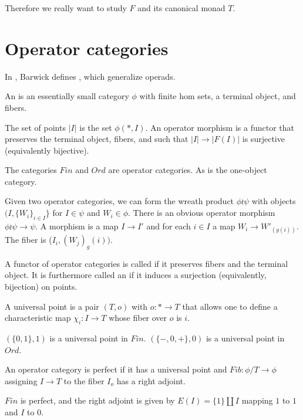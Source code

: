 Therefore we really want to study $F$ and its canonical monad $T.$

\section{Operator categories}
In \cite{Barwick18}, Barwick defines , which generalize operads. 

\begin{definition}
    An  is an essentially small category $\phi$ with finite hom sets, a terminal object, and fibers.
\end{definition}

The set of points $|I|$ is the set $\phi(*,I)$. An operator morphism is a functor that preserves the terminal object, fibers, and such that $|I|\rightarrow |F(I)|$ is surjective (equivalently bijective).

\begin{example}
    The categories $Fin$ and $Ord$ are operator categories. As is the one-object category.
\end{example}

Given two operator categories, we can form the wreath product $\phi\wr \psi$ with objects $(I,\{W_i\}_{i\in I}\}$ for $I\in \psi$ and $W_i\in \phi$. There is an obvious operator morphism $\phi\wr\psi\rightarrow \psi$. A morphism is a map $I\rightarrow I'$ and for each $i\in I$ a map $W_i\rightarrow W'_(g(i))$. The fiber is ($I_i,(W_j)_g(i))$.

\begin{definition}
    A functor of operator categories is called  if it preserves fibers and the terminal object. It is furthermore called an  if it induces a surjection (equivalently, bijection) on points.
\end{definition}

\begin{definition}
    A universal point is a pair $(T,o)$ with $o:*\rightarrow T$ that allows one to define a characteristic map $\chi_i:I\rightarrow T$ whose fiber over $o$ is $i.$
\end{definition}

\begin{example}
    $(\{0,1\},1)$ is a universal point in $Fin.$ $(\{-,0,+\},0)$ is a universal point in $Ord.$
\end{example}
\begin{definition}
    An operator category is perfect if it has a universal point and $Fib:\phi/T\rightarrow \phi$ assigning $I\rightarrow T$ to the fiber $I_o$ has a right adjoint. 
\end{definition}
\begin{example}
    $Fin$ is perfect, and the right adjoint is given by $E(I)=\{1\}\coprod I$ mapping $1$ to $1$ and $I$ to $0.$
\end{example}

